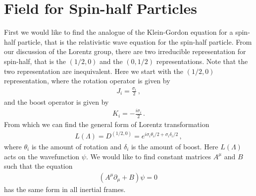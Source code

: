 \documentclass[11pt, onesided]{book}
\theoremstyle{break}
\theoremstyle{break}
\newcommand{\pd}{\partial}
\begin{document}
\chapter{Field for Spin-half Particles}
First we would like to find the analogue of the Klein-Gordon equation for a spin-half particle, that is the relativistic wave equation for the spin-half particle. From our discussion of the Lorentz group, there are two irreducible representation for spin-half, that is the $(1/2,0)$ and the $(0,1/2)$ representations. Note that the two representation are inequivalent. Here we start with the $(1/2,0)$ representation, where the rotation operator is given by
\begin{align*}
J_i = \frac{\sigma_i}{2}\,,
\end{align*}
and the boost operator is given by
\begin{align*}
K_i = -\frac{i\sigma_i}{2}\,.
\end{align*}
From which we can find the general form of Lorentz transformation
\begin{align*}
L(\Lambda) = D^{(1/2,0)} = e^{i\sigma_i \theta_i /2 + \sigma_i \delta_i / 2}\,,
\end{align*}
where $\theta_i$ is the amount of rotation and $\delta_i$ is the amount of boost. Here $L(\Lambda)$ acts on the wavefunction $\psi$. We would like to find constant matrices $A^\mu$ and $B$ such that the equation
\begin{align}
(A^\mu \pd_\mu + B ) \psi = 0\,
\end{align}
has the same form in all inertial frames. \\
\end{document}
